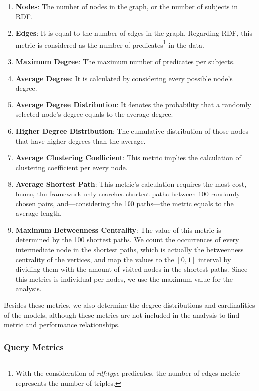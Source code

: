 \begin{enumerate}
	\item{\textbf{Nodes}}: The number of nodes in the graph, or the number of subjects in RDF.
	\item{\textbf{Edges}}: It is equal to the number of edges in the graph. Regarding RDF, this metric is considered as the number of predicates\footnote{With the consideration of \textit{rdf:type} predicates, the number of edges metric represents the number of triples.} in the data.
	\item{\textbf{Maximum Degree}}: The maximum number of predicates per subjects.
	\item{\textbf{Average Degree}}: It is calculated by considering every possible node's degree.
	\item{\textbf{Average Degree Distribution}}: It denotes the probability that a randomly selected node’s degree equals to the average degree.
	\item{\textbf{Higher Degree Distribution}}: The cumulative distribution of those nodes that have higher degrees than the average.
	\item{\textbf{Average Clustering Coefficient}}: This metric implies the calculation of clustering coefficient per every node.
	\item{\textbf{Average Shortest Path}}: This metric's calculation requires the most cost, hence, the framework only searches shortest paths between 100 randomly chosen pairs, and---considering the 100 paths---the metric equals to the average length.
	\item{\textbf{Maximum Betweenness Centrality}}: The value of this metric is determined by the 100 shortest paths. We count the occurrences of every intermediate node in the shortest paths, which is actually the betweenness centrality of the vertices, and map the values to the $[0,1]$ interval by dividing them with the amount of visited nodes in the shortest paths. Since this metrics is individual per nodes, we use the maximum value for the analysis.
\end{enumerate}

Besides these metrics, we also determine the degree distributions and cardinalities of the models, although these metrics are not included in the analysis to find metric and performance relationships.

\subsubsection{Query Metrics}

